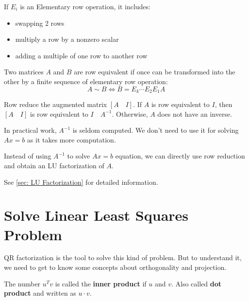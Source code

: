 \begin{note}
    If \(E_i\) is an Elementary row operation, it includes:
        \begin{itemize}
            \item swapping 2 rows
            \item multiply a row by a nonzero scalar
            \item adding a multiple of one row to another row
        \end{itemize}

    \begin{definition}
       Two matrices \(A\) and \(B\) are row equivalent if once can be transformed into the other by a finite sequence of elementary row operation:
       \[
        A \sim B  \iff B = E_k \cdots E_2 E_1 A
       \] 
    \end{definition}

    \begin{theorem}[Algorithm]
        Row reduce the augmented matrix \([A \quad I]\).  
        If \(A\) is row equivalent to \(I\), then \([A \quad I]\) is row equivalent to \(I \quad A^{-1}\).    
        Otherwise, \(A\)  does not have an inverse.
    \end{theorem}

    \begin{remark}
        In practical work, \(A^{-1}\) is seldom computed. 
        We don't need to use it for solving \(Ax = b\) as it takes more computation. 
    \end{remark}
\end{note}

Instead of using \(A^{-1}\) to solve \(Ax = b\) equation, we can directly use row reduction and obtain an LU factorization of \(A\).  

See \ref{sec: LU Factorization} for detailed information.

\section{Solve Linear Least Squares Problem}
QR factorization is the tool to solve this kind of problem.
But to understand it, we need to get to know some concepts about orthogonality and projection.

\begin{definition}
   The number \(u^T v\) is called the \textbf{inner product}  if \(u\) and \(v\).   
   Also called \textbf{dot product} and written as \(u \cdot v\).  
\end{definition}

